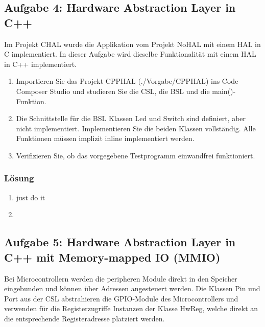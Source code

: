 \subsection{Aufgabe 4: Hardware Abstraction Layer in C++}
Im Projekt CHAL wurde die Applikation vom Projekt NoHAL mit einem HAL in C implementiert. In dieser Aufgabe wird dieselbe Funktionalität mit einem HAL in C++ implementiert.

\begin{enumerate}
  \item Importieren Sie das Projekt CPPHAL (./Vorgabe/CPPHAL) ins Code Composer Studio und studieren Sie die CSL, die BSL und die main()-Funktion.
  \item Die Schnittstelle für die BSL Klassen Led und Switch sind definiert, aber nicht implementiert. Implementieren Sie die beiden Klassen vollständig. Alle Funktionen müssen implizit inline implementiert werden.
  \item Verifizieren Sie, ob das vorgegebene Testprogramm einwandfrei funktioniert.
\end{enumerate}

\subsubsection{Lösung}
\begin{enumerate}
  \item just do it
  \item 
  \noindent\makebox[\linewidth]{\rule{\paperwidth}{0.4pt}}
  
\end{enumerate}

\subsection{Aufgabe 5: Hardware Abstraction Layer in C++ mit Memory-mapped IO (MMIO)}

Bei Microcontrollern werden die peripheren Module direkt in den Speicher eingebunden und können über Adressen angesteuert werden. Die Klassen Pin und Port aus der CSL abstrahieren die GPIO-Module des Microcontrollers und verwenden für die Registerzugriffe Instanzen der Klasse HwReg, welche direkt an die entsprechende Registeradresse platziert werden.

